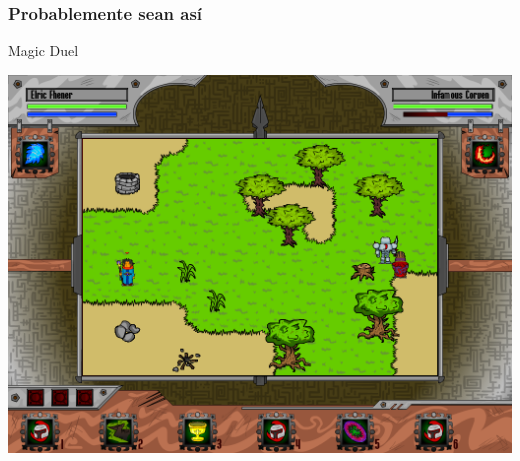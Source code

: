 \begin{frame}
	\frametitle{Probablemente sean así}

	\begin{center}
	Magic Duel
	
	    \includegraphics[scale=0.22]{img/magicduel.png}
	\end{center}
\end{frame}

